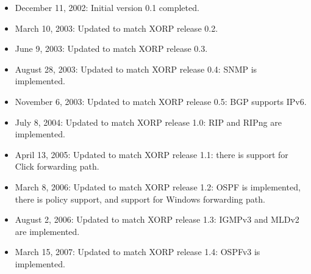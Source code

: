 \documentclass[11pt]{article}
\begin{document}
\begin{itemize}

  \item December 11, 2002: Initial version 0.1 completed.

  \item March 10, 2003: Updated to match XORP release 0.2.

  \item June 9, 2003: Updated to match XORP release 0.3.

  \item August 28, 2003: Updated to match XORP release 0.4: SNMP
  is implemented.

  \item November 6, 2003: Updated to match XORP release 0.5: BGP
  supports IPv6.

  \item July 8, 2004: Updated to match XORP release 1.0: RIP and RIPng
  are implemented.

  \item April 13, 2005: Updated to match XORP release 1.1: there is
  support for Click forwarding path.

  \item March 8, 2006: Updated to match XORP release 1.2: OSPF is
  implemented, there is policy support, and support for Windows
  forwarding path.

  \item August 2, 2006: Updated to match XORP release 1.3: IGMPv3 and
  MLDv2 are implemented.

  \item March 15, 2007: Updated to match XORP release 1.4: OSPFv3 is
  implemented.

\end{itemize}




\end{document}
